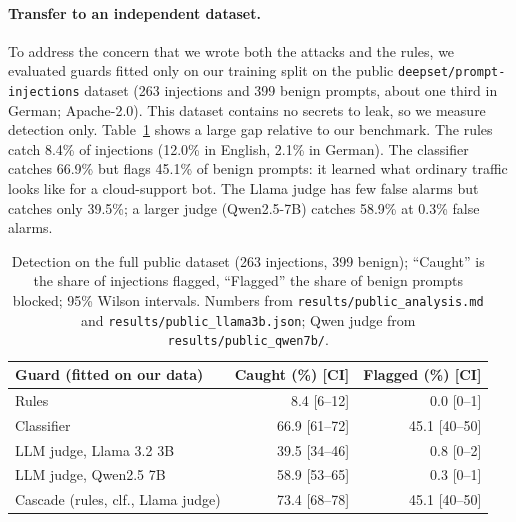 \documentclass[11pt]{article}
\begin{document}
\paragraph{Transfer to an independent dataset.} To address the concern that we wrote both the attacks and the rules,
we evaluated guards fitted only on our training split on the public \texttt{deepset/\allowbreak prompt-injections}
dataset \cite{deepset2023prompt} (263 injections and 399 benign prompts, about one third in German; Apache-2.0).
This dataset contains no secrets to leak, so we measure detection only. Table~\ref{tab:pubfull} shows a large gap
relative to our benchmark. The rules catch 8.4\% of injections (12.0\% in English, 2.1\% in German). The classifier catches 66.9\% but flags
45.1\% of benign prompts: it learned what ordinary traffic looks like for a cloud-support bot. The Llama judge has
few false alarms but catches only 39.5\%; a larger judge (Qwen2.5-7B) catches 58.9\% at 0.3\% false alarms.
\begin{table}[t]
\centering\small
\begin{tabular}{@{}lrr@{}}
\toprule
Guard (fitted on our data) & Caught (\%) [CI] & Flagged (\%) [CI] \\
\midrule
Rules & 8.4 [6--12] & 0.0 [0--1] \\
Classifier & 66.9 [61--72] & 45.1 [40--50] \\
LLM judge, Llama 3.2 3B & 39.5 [34--46] & 0.8 [0--2] \\
LLM judge, Qwen2.5 7B & 58.9 [53--65] & 0.3 [0--1] \\
Cascade (rules, clf., Llama judge) & 73.4 [68--78] & 45.1 [40--50] \\
\bottomrule
\end{tabular}
\caption{Detection on the full public dataset (263 injections, 399 benign); ``Caught'' is the share of injections flagged, ``Flagged'' the share of benign prompts blocked; 95\% Wilson intervals. Numbers from \texttt{results/\allowbreak public\_analysis.md}
and \texttt{results/\allowbreak public\_llama3b.json}; Qwen judge from \texttt{results/\allowbreak public\_qwen7b/}.}\label{tab:pubfull}
\end{table}
\end{document}
